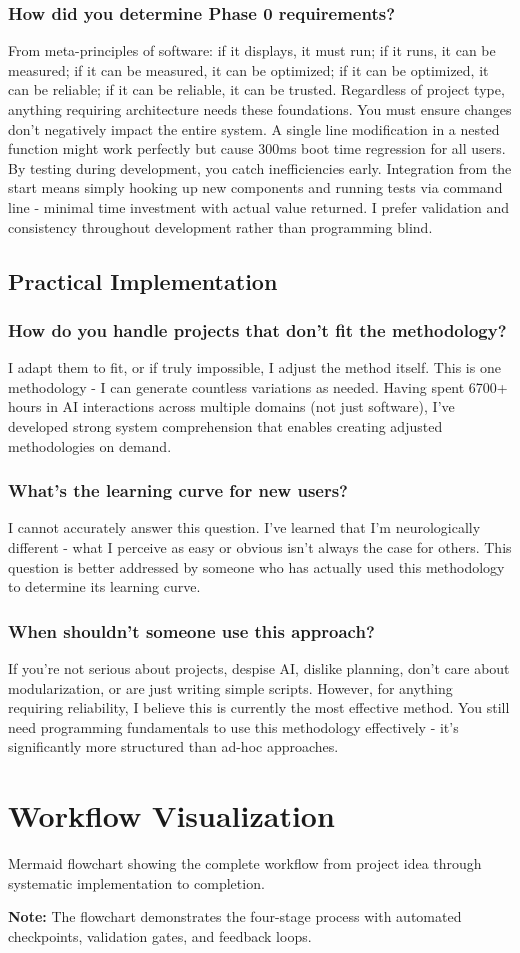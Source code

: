 \documentclass{article}
\begin{document}
\subsubsection{How did you determine Phase 0 requirements?}
From meta-principles of software: if it displays, it must run; if it runs, it can be measured; if it can be measured, it can be optimized; if it can be optimized, it can be reliable; if it can be reliable, it can be trusted. Regardless of project type, anything requiring architecture needs these foundations. You must ensure changes don't negatively impact the entire system. A single line modification in a nested function might work perfectly but cause 300ms boot time regression for all users. By testing during development, you catch inefficiencies early. Integration from the start means simply hooking up new components and running tests via command line - minimal time investment with actual value returned. I prefer validation and consistency throughout development rather than programming blind.

\subsection{Practical Implementation}

\subsubsection{How do you handle projects that don't fit the methodology?}
I adapt them to fit, or if truly impossible, I adjust the method itself. This is one methodology - I can generate countless variations as needed. Having spent 6700+ hours in AI interactions across multiple domains (not just software), I've developed strong system comprehension that enables creating adjusted methodologies on demand.

\subsubsection{What's the learning curve for new users?}
I cannot accurately answer this question. I've learned that I'm neurologically different - what I perceive as easy or obvious isn't always the case for others. This question is better addressed by someone who has actually used this methodology to determine its learning curve.

\subsubsection{When shouldn't someone use this approach?}
If you're not serious about projects, despise AI, dislike planning, don't care about modularization, or are just writing simple scripts. However, for anything requiring reliability, I believe this is currently the most effective method. You still need programming fundamentals to use this methodology effectively - it's significantly more structured than ad-hoc approaches.

\section{Workflow Visualization}
Mermaid flowchart showing the complete workflow from project idea through systematic implementation to completion.

\textbf{Note:} The flowchart demonstrates the four-stage process with automated checkpoints, validation gates, and feedback loops.
\end{document}
